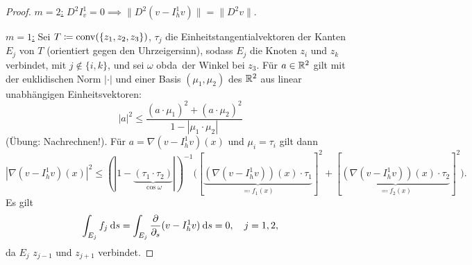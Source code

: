 \documentclass[../skript.tex]{subfiles}
\begin{document}
\begin{proof}
	\underline{$m=2$:} $D^2 I^1_v = 0 \implies \| D^2(v-I_h^1 v)\| = \|D^2 v\|$.

	\underline{$m=1$:} Sei $T \coloneqq \operatorname{conv}(\{z_1,z_2,z_3\})$, $\tau_j$ die Einheitstangentialvektoren der Kanten $E_j$ von $T$ (orientiert gegen den Uhrzeigersinn), sodass $E_j$ die Knoten $z_i$ und $z_k$ verbindet, mit $j\not\in\{i,k\}$, und sei $\omega$ \ac{obda}\ der Winkel bei $z_3$. Für $a\in\mathbb{R}^2$ gilt mit der euklidischen Norm $|\cdot|$ und einer Basis $(\mu_1,\mu_2)$ des $\mathbb{R}^2$ aus linear unabhängigen Einheitsvektoren:
	\[
		| a|^2 \leq \frac{(a\cdot\mu_1)^2 + (a\cdot\mu_2)^2}{1- |\mu_1\cdot\mu_2|}
	\]
	(Übung: Nachrechnen!). 
	Für $a = \nabla(v-I_h^1 v)(x)$ und $\mu_i = \tau_i$ gilt dann
	\[
		|\nabla(v-I_h^1 v)(x)|^2\leq (| 1-\underbrace{(\tau_1\cdot\tau_2)}_{\cos{\omega}}| )^{-1}\big( [\underbrace{(\nabla(v-I_h^1 v))(x)\cdot\tau_1}_{\eqqcolon f_1(x)}]^2 + [\underbrace{(\nabla(v-I_h^1 v))(x)\cdot\tau_2}_{\eqqcolon f_2(x)}]^2 \big).
	\] 
	Es gilt
	\[
		\int_{E_j} f_j \:\mathrm{d}s = \int_{E_j}\frac{\partial}{\partial_s}(v-I_h^1 v) \:\mathrm{d}s = 0,\quad j=1,2,
	\]
	da $E_j$ $z_{j-1}$ und $z_{j+1}$ verbindet.


\end{proof}
\end{document}
